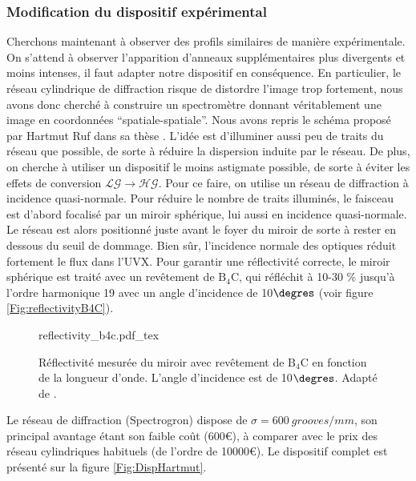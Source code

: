 \subsubsection{Modification du dispositif expérimental}
Cherchons maintenant à observer des profils similaires de manière expérimentale. On s'attend à observer l'apparition d'anneaux supplémentaires plus divergents et moins intenses, il faut adapter notre dispositif en conséquence. En particulier, le réseau cylindrique de diffraction risque de distordre l'image trop fortement, nous avons donc cherché à construire un spectromètre donnant véritablement une image en coordonnées ``spatiale-spatiale''. 
Nous avons repris le schéma proposé par Hartmut Ruf dans sa thèse . L'idée est d'illuminer aussi peu de traits du réseau que possible, de sorte à réduire la dispersion induite par le réseau. De plus, on cherche à utiliser un dispositif le moins astigmate possible, de sorte à éviter les effets de conversion $\mathcal{LG}\rightarrow \mathcal{HG}$. Pour ce faire, on utilise un réseau de diffraction à incidence quasi-normale. Pour réduire le nombre de traits illuminés, le faisceau est d'abord focalisé par un miroir sphérique, lui aussi en incidence quasi-normale. Le réseau est alors positionné juste avant le foyer du miroir de sorte à rester en dessous du seuil de dommage. Bien sûr, l'incidence normale des optiques réduit fortement le flux dans l'UVX. Pour garantir une réflectivité correcte, le miroir sphérique est traité avec un revêtement de $\mathrm{B}_\mathrm{4}\mathrm{C}$, qui réfléchit à 10-30 \% jusqu'à l'ordre harmonique 19 avec un angle d'incidence de 10$\degres$ (voir figure \ref{Fig:reflectivityB4C}). 

\begin{figure}[!ht]
\centering
\def\svgwidth{.7\columnwidth}
{reflectivity_b4c.pdf_tex}
\caption{Réflectivité mesurée du miroir avec revêtement de $\mathrm{B}_\mathrm{4}\mathrm{C}$ en fonction de la longueur d'onde. L'angle d'incidence est de 10$\degres$. Adapté de .}
\label{Fig:reflectivity_B4C}
\end{figure}

Le réseau de diffraction (Spectrogron) dispose de $\sigma=\SI{600}{grooves/mm}$, son principal avantage étant son faible coût (600€), à comparer avec le prix des réseau cylindriques habituels (de l'ordre de 10000€). Le dispositif complet est présenté sur la figure \ref{Fig:DispHartmut}.

